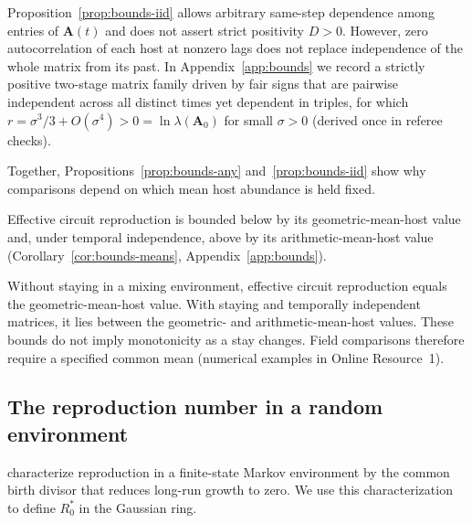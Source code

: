 \begin{remark}\label{rem:bounds-pairwise}
Proposition~\ref{prop:bounds-iid} allows arbitrary same-step dependence among entries of $\mathbf{A}(t)$ and does not assert strict positivity $D > 0$. However, zero autocorrelation of each host at nonzero lags does not replace independence of the whole matrix from its past. In Appendix~\ref{app:bounds} we record a strictly positive two-stage matrix family driven by fair signs that are pairwise independent across all distinct times yet dependent in triples, for which $r = \sigma^3/3 + O(\sigma^4) > 0 = \ln\lambda(\mathbf{A}_0)$ for small $\sigma > 0$ (derived once in referee checks).
\end{remark}

Together, Propositions~\ref{prop:bounds-any} and~\ref{prop:bounds-iid} show why comparisons depend on which mean host abundance is held fixed.

Effective circuit reproduction is bounded below by its geometric-mean-host value and, under temporal independence, above by its arithmetic-mean-host value (Corollary~\ref{cor:bounds-means}, Appendix~\ref{app:bounds}).

Without staying in a mixing environment, effective circuit reproduction equals the geometric-mean-host value. With staying and temporally independent matrices, it lies between the geometric- and arithmetic-mean-host values. These bounds do not imply monotonicity as a stay changes. Field comparisons therefore require a specified common mean (numerical examples in Online Resource~1).

\subsection{The reproduction number in a random environment}\label{subsec:bounds-r0star}

\citet{bacaer2013} characterize reproduction in a finite-state Markov environment by the common birth divisor that reduces long-run growth to zero. We use this characterization to define $R_0^*$ in the Gaussian ring.

